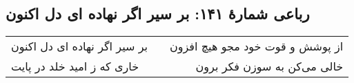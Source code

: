 \begin{center}
\section*{رباعی شمارهٔ ۱۴۱: بر سیر اگر نهاده ای دل اکنون}
\label{sec:141}
\begin{longtable}{l p{0.5cm} r}
بر سیر اگر نهاده ای دل اکنون
&&
از پوشش و قوت خود مجو هیچ افزون
\\
خاری که ز امید خلد در پایت
&&
خالی می‌کن به سوزن فکر برون
\\
\end{longtable}
\end{center}
